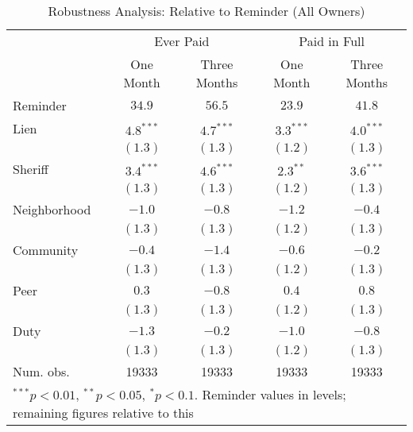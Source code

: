 \documentclass[12pt]{article}
\begin{document}
\begin{appendix}
\begin{table}[htbp]
\caption{Robustness Analysis: Relative to Reminder (All Owners)}\label{sh_lpm_mult}
\begin{center}
\begin{tabular}{l c c c c }
\hline
 & \multicolumn{2}{c}{Ever Paid} & \multicolumn{2}{c}{Paid in Full} \\
 & One Month & Three Months & One Month & Three Months \\
Reminder     & $34.9$ & $56.5$ & $23.9$ & $41.8$ \\
\hline
Lien         & $4.8^{***}$  & $4.7^{***}$  & $3.3^{***}$  & $4.0^{***}$  \\
             & $(1.3)$      & $(1.3)$      & $(1.2)$      & $(1.3)$      \\
Sheriff      & $3.4^{***}$  & $4.6^{***}$  & $2.3^{**}$   & $3.6^{***}$  \\
             & $(1.3)$      & $(1.3)$      & $(1.2)$      & $(1.3)$      \\
Neighborhood & $-1.0$       & $-0.8$       & $-1.2$       & $-0.4$       \\
             & $(1.3)$      & $(1.3)$      & $(1.2)$      & $(1.3)$      \\
Community    & $-0.4$       & $-1.4$       & $-0.6$       & $-0.2$       \\
             & $(1.3)$      & $(1.3)$      & $(1.2)$      & $(1.3)$      \\
Peer         & $0.3$        & $-0.8$       & $0.4$        & $0.8$        \\
             & $(1.3)$      & $(1.3)$      & $(1.2)$      & $(1.3)$      \\
Duty         & $-1.3$       & $-0.2$       & $-1.0$       & $-0.8$       \\
             & $(1.3)$      & $(1.3)$      & $(1.2)$      & $(1.3)$      \\
\hline
Num. obs.    & 19333        & 19333        & 19333        & 19333        \\
\hline
\multicolumn{5}{l}{\scriptsize{$^{***}p<0.01$, $^{**}p<0.05$, $^*p<0.1$. Reminder values in levels; remaining figures relative to this}}
\end{tabular}
\end{center}
\end{table}


\end{appendix}
\end{document}
